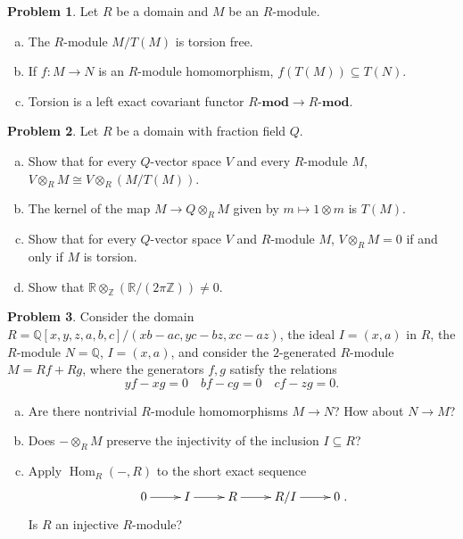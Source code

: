 \documentclass[11pt]{article}
\DeclareMathOperator{\Hom}{Hom}
\theoremstyle{definition}
\newtheorem{problem}{Problem}
\begin{document}
\vfill


\begin{problem} Let $R$ be a domain and $M$ be an $R$-module.
	\begin{enumerate}[a)]
		\item The $R$-module $M/T(M)$ is torsion free.
		\item If $f\!: M \longrightarrow N$ is an $R$-module homomorphism, $f(T(M)) \subseteq T(N)$.
		\item Torsion is a left exact covariant functor $R\textbf{-mod} \longrightarrow R\textbf{-mod}$.
	\end{enumerate}
\end{problem}

\vfill

\begin{problem}
	Let $R$ be a domain with fraction field $Q$.
	\begin{enumerate}[a)]
		\item Show that for every $Q$-vector space $V$ and every $R$-module $M$, $V \otimes_R M \cong V \otimes_R (M/T(M))$.
		\item The kernel of the map $M \longrightarrow Q \otimes_R M$ given by $m \mapsto 1 \otimes m$ is $T(M)$.		
		\item Show that for every $Q$-vector space $V$ and $R$-module $M$, $V \otimes_R M = 0$ if and only if $M$ is torsion.
		\item Show that $\mathbb{R} \otimes_\mathbb{Z} (\mathbb{R} / (2 \pi \mathbb{Z})) \neq 0$.
	\end{enumerate}
\end{problem}



\newpage

\begin{problem}
	Consider the domain $R = \mathbb{Q}[x,y,z,a,b,c]/(xb-ac,yc-bz,xc-az)$, the ideal $I = (x,a)$ in $R$, the $R$-module $N = \mathbb{Q}$, $I = (x,a)$, and consider the $2$-generated $R$-module $M = Rf + Rg$, where the generators $f, g$ satisfy the relations 
		$$yf-xg = 0 \quad bf - cg = 0 \quad cf - zg = 0.$$
			\begin{enumerate}[a)]
		\item Are there nontrivial $R$-module homomorphisms $M \longrightarrow N$? How about $N \longrightarrow M$?
		\item Does $- \otimes_R M$ preserve the injectivity of the inclusion $I \subseteq R$?
		\item Apply $\Hom_R(-,R)$ to the short exact sequence 
		$$\xymatrix{0 \ar[r] & I \ar[r] & R \ar[r] & R/I \ar[r] & 0}.$$
		Is $R$ an injective $R$-module?
		\end{enumerate}
\end{problem}
\end{document}
